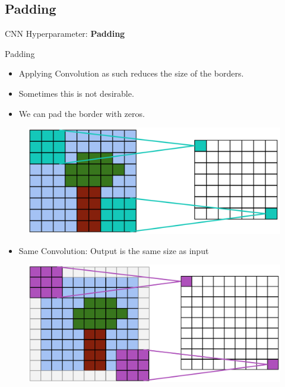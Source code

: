 \subsection{Padding}
\begin{frame}{}
    \LARGE CNN Hyperparameter: \textbf{Padding}
\end{frame}

\begin{frame}[allowframebreaks]{Padding}
\begin{itemize}
    \item Applying Convolution as such reduces the size of the borders.
    \item Sometimes this is not desirable.
    \item We can pad the border with zeros.
\end{itemize}


\begin{figure}
\centering
\includegraphics[width=1.0\textwidth,height=0.7\textheight,keepaspectratio]{images/cnn/pad_1.png}
\end{figure}

\framebreak

\begin{itemize}
    \item Same Convolution: Output is the same size as input
\end{itemize}


\begin{figure}
\centering
\includegraphics[width=1.0\textwidth,height=0.8\textheight,keepaspectratio]{images/cnn/pad_3.png}
\end{figure}



\end{frame}
